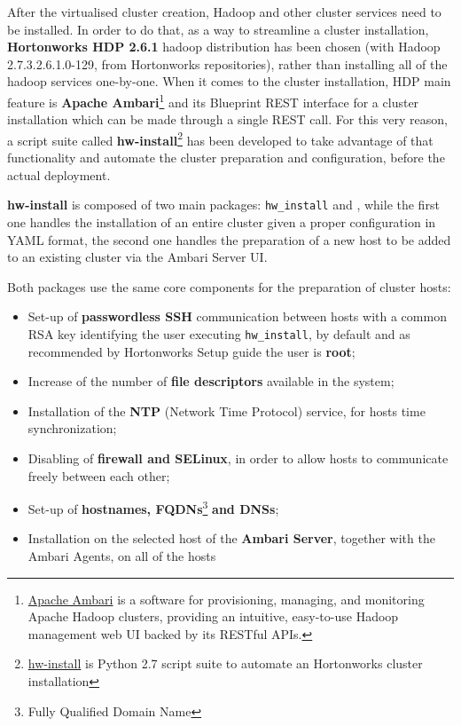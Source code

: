 After the virtualised cluster creation, Hadoop and other cluster services need to be installed. In order to do that, as a way to streamline a cluster installation, \textbf{Hortonworks HDP 2.6.1} hadoop distribution has been chosen (with Hadoop 2.7.3.2.6.1.0-129, from Hortonworks repositories), rather than installing all of the hadoop services one-by-one. When it comes to the cluster installation, HDP main feature is \textbf{Apache Ambari}\footnote{\href{https://ambari.apache.org/}{Apache Ambari} is a software for provisioning, managing, and monitoring Apache Hadoop clusters, providing an intuitive, easy-to-use Hadoop management web UI backed by its RESTful APIs.} and its Blueprint REST interface for a cluster installation which can be made through a single REST call. For this very reason, a script suite called \textbf{hw-install}\footnote{\href{https://github.com/fedexist/hw-install}{hw-install} is Python 2.7 script suite to automate an Hortonworks cluster installation} has been developed to take advantage of that functionality and automate the cluster preparation and configuration, before the actual deployment.

\textbf{hw-install} is composed of two main packages: \texttt{hw\_install} and \texttt{}, while the first one handles the installation of an entire cluster given a proper configuration in YAML format, the second one handles the preparation of a new host to be added to an existing cluster via the Ambari Server UI.

Both packages use the same core components for the preparation of cluster hosts:

\begin{itemize}
    \item Set-up of \textbf{passwordless SSH} communication between hosts with a common RSA key identifying the user executing \texttt{hw\_install}, by default and as recommended by Hortonworks Setup guide the user is \textbf{root};
    \item Increase of the number of \textbf{file descriptors} available in the system;
    \item Installation of the \textbf{NTP} (Network Time Protocol) service, for hosts time synchronization;
    \item Disabling of \textbf{firewall and SELinux}, in order to allow hosts to communicate freely between each other;
    \item Set-up of \textbf{hostnames, FQDNs}\footnote{Fully Qualified Domain Name} \textbf{and DNSs};
    \item Installation on the selected host of the \textbf{Ambari Server}, together with the Ambari Agents, on all of the hosts
\end{itemize}

